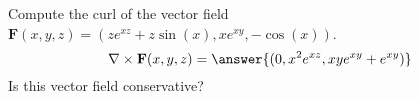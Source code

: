 \begin{problem}
Compute the curl of the vector field $\mathbf{F}(x,y,z) = (ze^{xz}+z\sin(x), xe^{xy},-\cos(x))$.
\[
\nabla\times\mathbf{F}(x,y,z) = \answer{(0,x^2e^{xz},xye^{xy}+e^{xy})}
\]
Is this vector field conservative?
\begin{multipleChoice}
\end{multipleChoice}
\end{problem}
